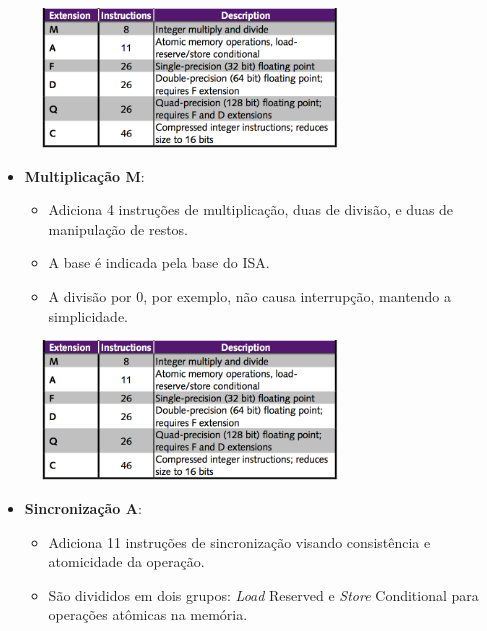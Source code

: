 \documentclass[red, aspectratio=169, xcolor=dvipsnames]{beamer}
\let\olditem=\item%
\renewcommand{\item}{\olditem \justifying}
\begin{document}
\begin{frame}%
		\begin{figure}
			\centering
			\label{fig:bi2}
			\includegraphics[width=0.7\textwidth]{img/base-instruction-b.png}
		\end{figure}
	
	\begin{itemize}
		\item \textbf{Multiplicação M}:
		\begin{itemize}
			\item Adiciona 4 instruções de multiplicação, duas de divisão, e duas de manipulação de restos.
			\item A base é indicada pela base do ISA.
			\item A divisão por 0, por exemplo, não causa interrupção, mantendo a simplicidade.
		\end{itemize}
	\end{itemize}
\end{frame}

\begin{frame}%
	\begin{figure}
		\centering
		\label{fig:bi2}
		\includegraphics[width=0.7\textwidth]{img/base-instruction-b.png}
	\end{figure}
	\begin{itemize}
		\item \textbf{Sincronização A}:
		\begin{itemize}
			\setlength{\itemsep}{1.5em}
			\item Adiciona 11 instruções de sincronização visando consistência e atomicidade da operação.
			\item São divididos em dois grupos: \textit{Load} Reserved e \textit{Store} Conditional para operações atômicas na memória.
		\end{itemize}

	\end{itemize}
\end{frame}
\end{document}
